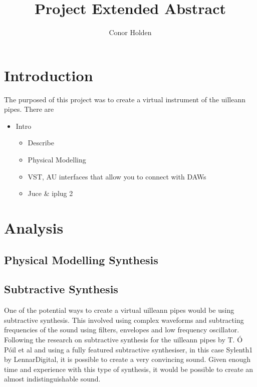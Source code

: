 \documentclass[12pt]{article}
\title{Project Extended Abstract}
\author{Conor Holden }
\begin{document}
	
	\maketitle
		
		
		
\section{Introduction}

	The purposed of this project was to create a virtual instrument of the uilleann pipes. There are
	
	\begin{itemize}
		
		\item Intro
			\begin{itemize}
				\item Describe 
			\end{itemize}
		
		
			\begin{itemize}
				\item Physical Modelling
				\item VST, AU interfaces that allow you to connect with DAWs
				\item Juce \& iplug 2
			\end{itemize}
		
	\end{itemize}

\section{Analysis}

	\subsection{Physical Modelling Synthesis}
 	

	\subsection{Subtractive Synthesis}
	
	One of the potential ways to create a virtual uilleann pipes would be using subtractive synthesis. This involved using complex
	waveforms and subtracting frequencies of the sound using filters, envelopes and low frequency oscillator. Following the
	research on subtractive synthesis for the uilleann pipes by T. Ó Póil et al and using a fully featured subtractive synthesiser,
	in this case Sylenth1 by LennarDigital, it is possible to create a very convincing sound. Given enough time and experience with
	this type of synthesis, it would be possible to create an almost indistinguishable sound.
	
\end{document}
